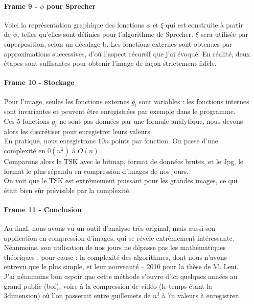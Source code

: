 \documentclass[12pt,a4paper]{article}
\begin{document}
\paragraph{Frame 9 - $\phi$ pour Sprecher}
Voici la représentation graphique des fonctions $\phi$ et $\xi$ qui est construite à partir de $\phi$, telles qu'elles sont définies pour l'algorithme de Sprecher.
$\xi$ sera utilisée par superposition, selon un décalage b.
Les fonctions externes sont obtenues par approximations successives, d'où l'aspect récursif que j'ai évoqué. En réalité, deux étapes sont suffisantes pour obtenir l'image de façon strictement fidèle.\\

\paragraph{Frame 10 - Stockage} Pour l'image, seules les fonctions externes $g_i$ sont variables : les fonctions internes sont invariantes et peuvent être enregistrées par exemple dans le programme.\\
Ces 5 fonctions $g_i$ ne sont pas données par une formule analytique, nous devons alors les discrétiser pour enregistrer
leurs valeurs.\\
En pratique, nous enregistrons $10n$ points par fonction. On passe d'une complexité en $0(n^2)$ à $O(n)$.\\

Comparons alors le TSK avec le bitmap, format de données brutes, et le Jpg, le format le plus répandu en compression d'images de nos jours.\\
On voit que le TSK est extrêmement puissant pour les grandes images, ce qui était bien sûr prévisible par la complexité.\\

\paragraph{Frame 11 - Conclusion} Au final, nous avons vu un outil d'analyse très original, mais aussi son application en compression d'images, qui se révèle extrêmement intéressante.\\
Néanmoins, son utilisation de nos jours ne dépasse pas les mathématiques théoriques ; pour cause : la complexité des algorithmes, dont nous n'avons entrevu que le plus simple, et leur nouveauté -- 2010 pour la thèse de M. Leni.\\

J'ai néanmoins bon espoir que cette méthode s'ouvre d'ici quelques années au grand public (bof), voire à la compression de vidéo (le temps étant la 3\ieme dimension) où l'on passerait entre guillemets de $n^3$ à $7n$ valeurs à enregistrer.
\end{document}
